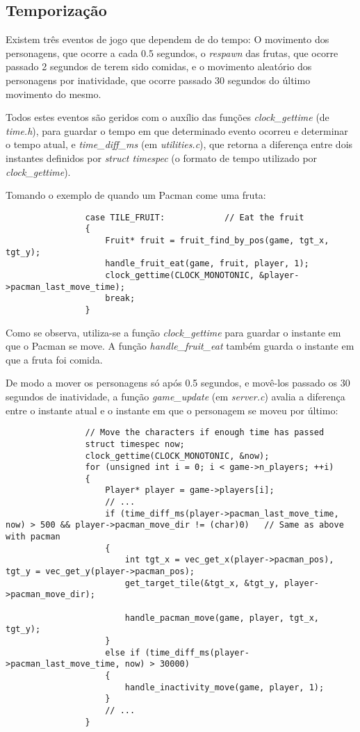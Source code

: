 \documentclass[a4paper]{report}
\begin{document}
        \subsection{Temporização}
            \par Existem três eventos de jogo que dependem de do tempo: O movimento dos personagens, que ocorre a cada 0.5 segundos, o \textit{respawn} das frutas, que ocorre passado 2 segundos de terem sido comidas, e o movimento aleatório dos personagens por inatividade, que ocorre passado 30 segundos do último movimento do mesmo.
            \par Todos estes eventos são geridos com o auxílio das funções \textit{clock\_gettime} (de \textit{time.h}), para guardar o tempo em que determinado evento ocorreu e determinar o tempo atual, e \textit{time\_diff\_ms} (em \textit{utilities.c}), que retorna a diferença entre dois instantes definidos por \textit{struct timespec} (o formato de tempo utilizado por \textit{clock\_gettime}).
            \par Tomando o exemplo de quando um Pacman come uma fruta:
            \begin{lstlisting}
                case TILE_FRUIT:            // Eat the fruit
                {
                    Fruit* fruit = fruit_find_by_pos(game, tgt_x, tgt_y);
                    handle_fruit_eat(game, fruit, player, 1);
                    clock_gettime(CLOCK_MONOTONIC, &player->pacman_last_move_time);    
                    break;
                }
            \end{lstlisting}
            \par Como se observa, utiliza-se a função \textit{clock\_gettime} para guardar o instante em que o Pacman se move. A função \textit{handle\_fruit\_eat} também guarda o instante em que a fruta foi comida.
            \par De modo a mover os personagens só após 0.5 segundos, e movê-los passado os 30 segundos de inatividade, a função \textit{game\_update} (em \textit{server.c}) avalia a diferença entre o instante atual e o instante em que o personagem se moveu por último:
            \begin{lstlisting}
                // Move the characters if enough time has passed
                struct timespec now;
                clock_gettime(CLOCK_MONOTONIC, &now);
                for (unsigned int i = 0; i < game->n_players; ++i)
                {
                    Player* player = game->players[i];
                    // ...
                    if (time_diff_ms(player->pacman_last_move_time, now) > 500 && player->pacman_move_dir != (char)0)   // Same as above with pacman
                    {
                        int tgt_x = vec_get_x(player->pacman_pos), tgt_y = vec_get_y(player->pacman_pos);
                        get_target_tile(&tgt_x, &tgt_y, player->pacman_move_dir);
            
                        handle_pacman_move(game, player, tgt_x, tgt_y);
                    }
                    else if (time_diff_ms(player->pacman_last_move_time, now) > 30000)
                    {
                        handle_inactivity_move(game, player, 1);
                    }
                    // ...
                }
            \end{lstlisting}
\end{document}
